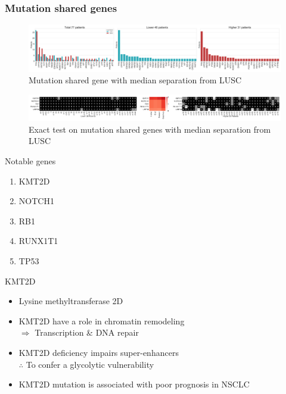\documentclass{beamer}
\begin{document}
            \begin{frame}[allowframebreaks]
                \frametitle{Mutation shared genes}

                \begin{figure}
                    \includegraphics[width=0.9 \linewidth]{figures/Mutation_Shared_Proportion/Genes/BWA.SQC.Mean.pdf}
                    \caption{Mutation shared gene with median separation from LUSC}
                \end{figure}
                \framebreak

                \begin{figure}
                    \includegraphics[width=0.9 \linewidth]{figures/Mutation_Shared_Proportion/Exact/BWA-SQC.Median.pdf}
                    \caption{Exact test on mutation shared genes with median separation from LUSC}
                \end{figure}

                \begin{block}{Notable genes}
                    \begin{enumerate}
                        \item KMT2D
                        \item NOTCH1
                        \item RB1
                        \item RUNX1T1
                        \item TP53
                    \end{enumerate}
                \end{block}

                \begin{block}{KMT2D}
                    \begin{itemize}
                        \item Lysine methyltransferase 2D
                        \item KMT2D have a role in chromatin remodeling \\
                            $\Rightarrow$ Transcription \& DNA repair \cite{KMT2D-01, KMT2D-02}
                        \item KMT2D deficiency impairs super-enhancers \\
                            $\therefore$ To confer a glycolytic vulnerability \cite{KMT2D-03}
                        \item KMT2D mutation is associated with poor prognosis in NSCLC \cite{KMT2D-04}
                    \end{itemize}
                \end{block}


\end{frame}
\end{document}

